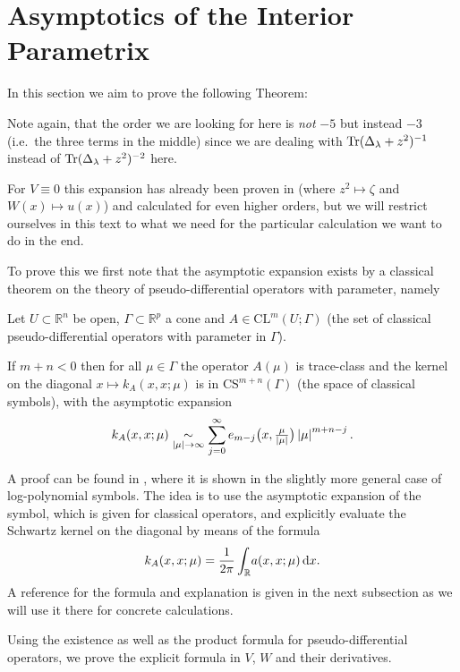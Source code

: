 \section{Asymptotics of the Interior Parametrix}
In this section we aim to prove the following Theorem:
\begin{MainTheorem}
  \label{main:interior}
  
  \begin{Remark}
    Note again, that the order we are looking for here is \emph{not} $-5$ but
    instead $-3$ (i.e.\ the three terms in the middle) since we are dealing with
    $\Tr(\Delta_\lambda + z^2)^{-1}$ instead of $\Tr(\Delta_\lambda + z^2)^{-2}$
    here.
  \end{Remark}
  \begin{Remark}
    For $V\equiv 0$ this expansion has already been proven in
    \cite[Ch 2.1]{Gel'fand1975} (where $z^2 \mapsto \zeta$ and $W(x) \mapsto
    u(x)$) and calculated for even higher orders, but we will restrict ourselves
    in this text to what we need for the particular calculation we want to do in
    the end.
  \end{Remark}
\end{MainTheorem}
To prove this we first note that the asymptotic expansion exists by a classical
theorem on the theory of pseudo-differential operators with parameter, namely
\begin{Theorem}
  Let $U\subset\mathbb{R}^n$ be open, $\Gamma\subset\mathbb{R}^p$ a cone and
  $A\in\mathrm{CL}^m(U;\Gamma)$ (the set of classical pseudo-differential
  operators with parameter in $\Gamma$).

  If $m+n<0$ then for all $\mu\in\Gamma$ the operator $A(\mu)$ is trace-class
  and the kernel on the diagonal $x\mapsto k_A(x, x;\mu)$ is in
  $\mathrm{CS}^{m+n}(\Gamma)$ (the space of classical symbols), with the
  asymptotic expansion
  \begin{equation*}
    k_A(x,x;\mu)\SimAs{\Abs{\mu}\to\infty}
    \sum_{j=0}^{\infty} e_{m-j}\bigl(x,\tfrac{\mu}{\Abs{\mu}}\bigr)
    \Abs{\mu}^{m+n-j}.
  \end{equation*}
  \begin{Proof}
    A proof can be found in \cite[Thm 5.1]{Les:PDO}, where it is shown in the
    slightly more general case of log-polynomial symbols. The idea is to use
    the asymptotic expansion of the symbol, which is given for classical
    operators, and explicitly evaluate the Schwartz kernel on the diagonal by
    means of the formula
    \begin{equation*}
      k_A(x,x;\mu) = \frac{1}{2\pi}\Integ{\mathbb R}{x}{a(x,x;\mu)}.
    \end{equation*}
    A reference for the formula and explanation is given in the next subsection
    as we will use it there for concrete calculations.
  \end{Proof}
\end{Theorem}
Using the existence as well as the product formula for pseudo-differential
operators, we prove the explicit formula in $V$, $W$ and their derivatives.

